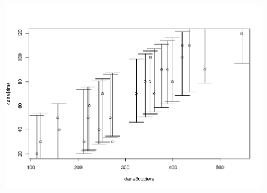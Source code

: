 \documentclass[9pt]{article}  %
\begin{document}
 
    \begin{figure}[H]
      \centering
      \includegraphics[width=1.2\textwidth]{5.png}
      \caption {}
    \end{figure} 

    


    
    
\end{document}
